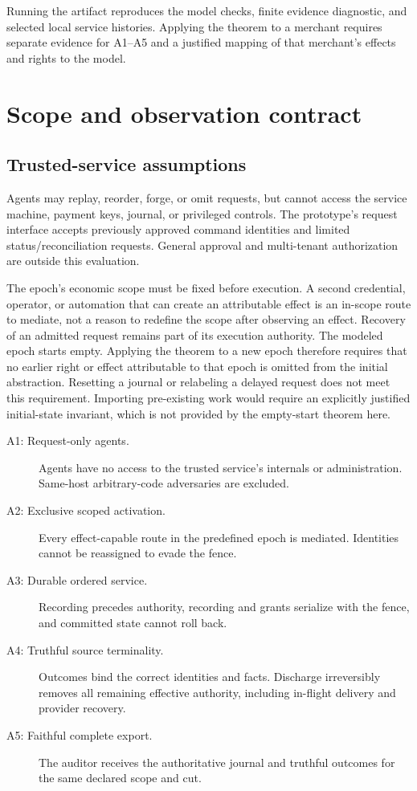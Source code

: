 \documentclass[letterpaper]{article}
\begin{document}
Running the artifact reproduces the model checks, finite evidence diagnostic,
and selected local service histories. Applying the theorem to a merchant
requires separate evidence for A1--A5 and a justified mapping of that merchant's
effects and rights to the model.

\section{Scope and observation contract}
\label{sec:scope}
\subsection{Trusted-service assumptions}
Agents may replay, reorder, forge, or omit requests, but cannot access the
service machine, payment keys, journal, or privileged controls. The prototype's
request interface accepts previously approved command identities and limited
status/reconciliation requests. General approval and multi-tenant authorization
are outside this evaluation.

The epoch's economic scope must be fixed before execution. A second credential,
operator, or automation that can create an attributable effect is an in-scope
route to mediate, not a reason to redefine the scope after observing an effect.
Recovery of an admitted request remains part of its execution authority.
The modeled epoch starts empty. Applying the theorem to a new epoch therefore
requires that no earlier right or effect attributable to that epoch is omitted
from the initial abstraction. Resetting a journal or relabeling a delayed
request does not meet this requirement. Importing pre-existing work would
require an explicitly justified initial-state invariant, which is not provided
by the empty-start theorem here.

\begin{description}
\item[A1: Request-only agents.] Agents have no access to the trusted service's
internals or administration. Same-host arbitrary-code adversaries are excluded.
\item[A2: Exclusive scoped activation.] Every effect-capable route in the
predefined epoch is mediated. Identities cannot be reassigned to evade the fence.
\item[A3: Durable ordered service.] Recording precedes authority, recording
and grants serialize with the fence, and committed state cannot roll back.
\item[A4: Truthful source terminality.] Outcomes bind the correct identities
and facts. Discharge irreversibly removes all remaining effective authority,
including in-flight delivery and provider recovery.
\item[A5: Faithful complete export.] The auditor receives the authoritative
journal and truthful outcomes for the same declared scope and cut.
\end{description}
\end{document}
